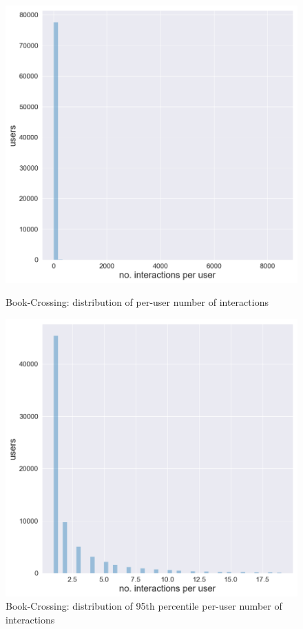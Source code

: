 \begin{figure}[htbp]
    \begin{minipage}{0.48\textwidth}
    \centering
      \includegraphics[width=\textwidth]{datasets/Book-Crossing_user_interaction_distr.png}
      \caption{Book-Crossing: distribution of per-user number of interactions}
      \label{fig:bx_dist}
    \end{minipage}
    \hfill
    \begin{minipage}{0.48\textwidth}
    \centering
     \includegraphics[width=\textwidth]{datasets/Book-Crossing_95th_interaction_distr.png} 
     \caption{Book-Crossing: distribution of 95th percentile per-user number of interactions}
      \label{fig:bx_dist_95}
    \end{minipage}
\end{figure}